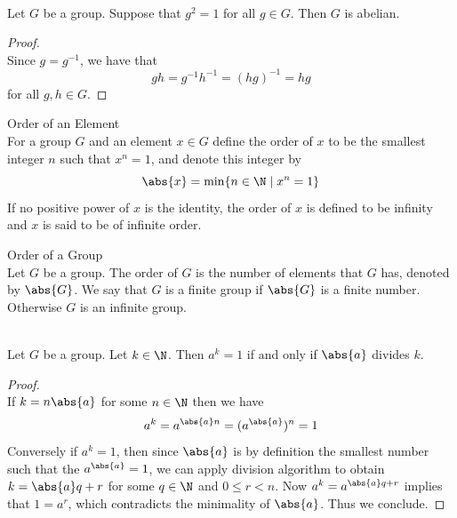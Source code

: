 \documentclass[a4paper]{article}
\begin{document}
\begin{eg}{}{}\\
Let $G$ be a group. Suppose that $g^2=1$ for all $g\in G$. Then $G$ is abelian. 
\begin{proof}\\
Since $g=g^{-1}$, we have that $$gh=g^{-1}h^{-1}=(hg)^{-1}=hg$$ for all $g,h\in G$. 
\end{proof}
\end{eg}

\begin{defn}{Order of an Element}{}\\
For a group $G$ and an element $x\in G$ define the order of $x$ to be the smallest integer $n$ such that $x^n=1$, and denote this integer by $$\abs{x}=\min\{n\in\N\;|\;x^n=1\}$$ If no positive power of $x$ is the identity, the order of $x$ is defined to be infinity and $x$ is said to be of infinite order. 
\end{defn}

\begin{defn}{Order of a Group}{}\\
Let $G$ be a group. The order of $G$ is the number of elements that $G$ has, denoted by $\abs{G}$. We say that $G$ is a finite group if $\abs{G}$ is a finite number. Otherwise $G$ is an infinite group. 
\end{defn}

\begin{lmm}{}{}\\
Let $G$ be a group. Let $k\in\N$. Then $a^k=1$ if and only if $\abs{a}$ divides $k$. 
\begin{proof}\\
If $k=n\abs{a}$ for some $n\in\N$ then we have $$a^k=a^{\abs{a}n}=(a^\abs{a})^n=1$$ Conversely if $a^k=1$, then since $\abs{a}$ is by definition the smallest number such that the $a^\abs{a}=1$, we can apply division algorithm to obtain $k=\abs{a}q+r$ for some $q\in\N$ and $0\leq r<n$. Now $a^{k}=a^{\abs{a}q+r}$ implies that $1=a^r$, which contradicts the minimality of $\abs{a}$. Thus we conclude. 
\end{proof}
\end{lmm}
\end{document}
